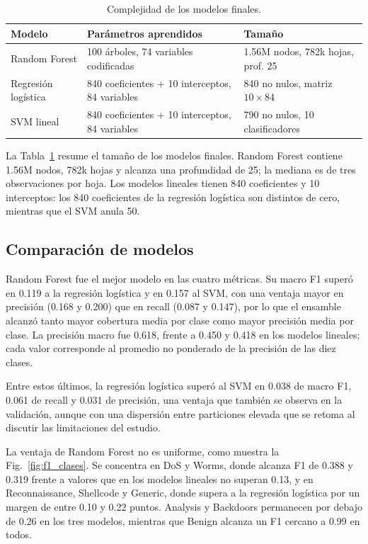 \documentclass[conference]{IEEEtran}
\begin{document}
\begin{table}[!t]
\centering
\caption{Complejidad de los modelos finales.}
\label{tab:parametros_finales}
\footnotesize
\renewcommand{\arraystretch}{1.05}
\begin{tabular}{@{}p{} p{} p{}@{}}
\hline
\textbf{Modelo} & \textbf{Parámetros aprendidos} & \textbf{Tamaño} \\
\hline
Random Forest & 100 árboles, 74 variables codificadas & 1.56M nodos, 782k hojas, prof. 25 \\
Regresión logística & 840 coeficientes + 10 interceptos, 84 variables & 840 no nulos, matriz $10\times84$ \\
SVM lineal & 840 coeficientes + 10 interceptos, 84 variables & 790 no nulos, 10 clasificadores \\
\hline
\end{tabular}
\end{table}

La Tabla~\ref{tab:parametros_finales} resume el tamaño de los modelos finales. Random Forest contiene 1.56M nodos, 782k hojas y alcanza una profundidad de 25; la mediana es de tres observaciones por hoja. Los modelos lineales tienen 840 coeficientes y 10 interceptos: los 840 coeficientes de la regresión logística son distintos de cero, mientras que el SVM anula 50.

\subsection{Comparación de modelos}

Random Forest fue el mejor modelo en las cuatro métricas. Su macro F1 superó en 0.119 a la regresión logística y en 0.157 al SVM, con una ventaja mayor en precisión (0.168 y 0.200) que en recall (0.087 y 0.147), por lo que el ensamble alcanzó tanto mayor cobertura media por clase como mayor precisión media por clase. La precisión macro fue 0.618, frente a 0.450 y 0.418 en los modelos lineales; cada valor corresponde al promedio no ponderado de la precisión de las diez clases.

Entre estos últimos, la regresión logística superó al SVM en 0.038 de macro F1, 0.061 de recall y 0.031 de precisión, una ventaja que también se observa en la validación, aunque con una dispersión entre particiones elevada que se retoma al discutir las limitaciones del estudio.

La ventaja de Random Forest no es uniforme, como muestra la Fig.~\ref{fig:f1_clases}. Se concentra en DoS y Worms, donde alcanza F1 de 0.388 y 0.319 frente a valores que en los modelos lineales no superan 0.13, y en Reconnaissance, Shellcode y Generic, donde supera a la regresión logística por un margen de entre 0.10 y 0.22 puntos. Analysis y Backdoors permanecen por debajo de 0.26 en los tres modelos, mientras que Benign alcanza un F1 cercano a 0.99 en todos.
\end{document}
